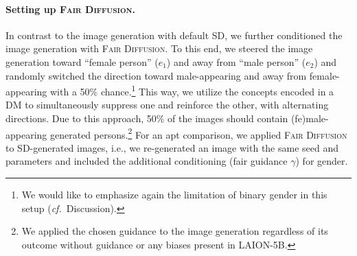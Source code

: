 \documentclass{article}%
\newcommand{\cf}{\emph{cf.}~}
\begin{document}
\paragraph{Setting up \textsc{Fair Diffusion}.}
In contrast to the image generation with default SD, we further conditioned the image generation with \textsc{Fair Diffusion}. To this end, we steered the image generation toward ``female person'' ($e_1$) and away from ``male person'' ($e_2$) and randomly switched the direction toward male-appearing and away from female-appearing with a 50\% chance.\footnote{We would like to emphasize again the limitation of binary gender in this setup (\cf Discussion).} This way, we utilize the concepts encoded in a DM to simultaneously suppress one and reinforce the other, with alternating directions. Due to this approach, 50\% of the images should contain (fe)male-appearing generated persons.\footnote{We applied the chosen guidance to the image generation regardless of its outcome without guidance or any biases present in LAION-5B.}
For an apt comparison, we applied \textsc{Fair Diffusion} to SD-generated images, i.e., we re-generated an image with the same seed and parameters and included the additional conditioning (fair guidance $\gamma$) for gender.
\end{document}
